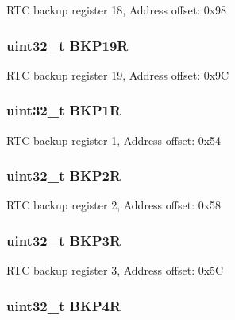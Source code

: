 R\-T\-C backup register 18, Address offset\-: 0x98 \hypertarget{struct_r_t_c___type_def_a4ec1dd54d976989b7c9e59fb14d974fb}{
\subsubsection[{B\-K\-P19\-R}]{ uint32\-\_\-t B\-K\-P19\-R}}\label{struct_r_t_c___type_def_a4ec1dd54d976989b7c9e59fb14d974fb}
R\-T\-C backup register 19, Address offset\-: 0x9\-C \hypertarget{struct_r_t_c___type_def_af85290529fb82acef7c9fcea3718346c}{
\subsubsection[{B\-K\-P1\-R}]{ uint32\-\_\-t B\-K\-P1\-R}}\label{struct_r_t_c___type_def_af85290529fb82acef7c9fcea3718346c}
R\-T\-C backup register 1, Address offset\-: 0x54 \hypertarget{struct_r_t_c___type_def_aaa251a80daa57ad0bd7db75cb3b9cdec}{
\subsubsection[{B\-K\-P2\-R}]{ uint32\-\_\-t B\-K\-P2\-R}}\label{struct_r_t_c___type_def_aaa251a80daa57ad0bd7db75cb3b9cdec}
R\-T\-C backup register 2, Address offset\-: 0x58 \hypertarget{struct_r_t_c___type_def_a0b1eeda834c3cfd4d2c67f242f7b2a1c}{
\subsubsection[{B\-K\-P3\-R}]{ uint32\-\_\-t B\-K\-P3\-R}}\label{struct_r_t_c___type_def_a0b1eeda834c3cfd4d2c67f242f7b2a1c}
R\-T\-C backup register 3, Address offset\-: 0x5\-C \hypertarget{struct_r_t_c___type_def_ab13e106cc2eca92d1f4022df3bfdbcd7}{
\subsubsection[{B\-K\-P4\-R}]{ uint32\-\_\-t B\-K\-P4\-R}}\label{struct_r_t_c___type_def_ab13e106cc2eca92d1f4022df3bfdbcd7}
